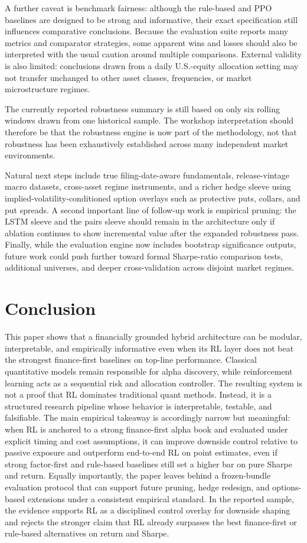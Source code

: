 \documentclass[11pt]{article}
\begin{document}
A further caveat is benchmark fairness: although the rule-based and PPO
baselines are designed to be strong and informative, their exact specification
still influences comparative conclusions.
Because the evaluation suite reports many metrics and comparator strategies,
some apparent wins and losses should also be interpreted with the usual caution
around multiple comparisons.
External validity is also limited: conclusions drawn from a daily U.S.-equity
allocation setting may not transfer unchanged to other asset classes,
frequencies, or market microstructure regimes.

The currently reported robustness summary is still based on only six rolling
windows drawn from one historical sample. The workshop interpretation should
therefore be that the robustness engine is now part of the methodology, not
that robustness has been exhaustively established across many independent market
environments.

Natural next steps include true filing-date-aware fundamentals, release-vintage
macro datasets, cross-asset regime instruments, and a richer hedge sleeve using
implied-volatility-conditioned option overlays such as protective puts, collars,
and put spreads. A second important line of follow-up work is empirical pruning:
the LSTM sleeve and the pairs sleeve should remain in the architecture only if
ablation continues to show incremental value after the expanded robustness pass.
Finally, while the evaluation engine now includes bootstrap significance
outputs, future work could push further toward formal Sharpe-ratio comparison
tests, additional universes, and deeper cross-validation across disjoint market
regimes.

\section{Conclusion}

This paper shows that a financially grounded hybrid architecture can be modular,
interpretable, and empirically informative even when its RL layer does not beat
the strongest finance-first baselines on top-line performance. Classical quantitative models remain
responsible for alpha discovery, while reinforcement learning acts as a
sequential risk and allocation controller. The resulting system is not a proof
that RL dominates traditional quant methods. Instead, it is a structured
research pipeline whose behavior is interpretable, testable, and falsifiable.
The main empirical takeaway is accordingly narrow but meaningful: when RL is
anchored to a strong finance-first alpha book and evaluated under explicit
timing and cost assumptions, it can improve downside control relative to passive
exposure and outperform end-to-end RL on point estimates, even if strong
factor-first and rule-based baselines still set a higher bar on pure Sharpe and
return. Equally importantly, the paper leaves behind a frozen-bundle evaluation
protocol that can support future pruning, hedge redesign, and options-based
extensions under a consistent empirical standard. In the reported sample, the
evidence supports RL as a disciplined control overlay for downside shaping and
rejects the stronger claim that RL already surpasses the best finance-first or
rule-based alternatives on return and Sharpe.
\end{document}
